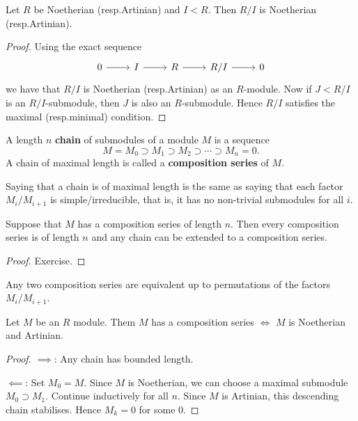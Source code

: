 \begin{prop}[3.7]
  Let $R$ be Noetherian (resp.\@ Artinian) and $I<R$.
  Then $R/I$ is Noetherian (resp.\@ Artinian).
\end{prop}

\begin{proof}
  Using the exact sequence
  \begin{equation*}
    \begin{tikzcd}
      0 \ar[r] & I \ar[r] & R \ar[r] & R/I \ar[r] & 0
    \end{tikzcd}
  \end{equation*}
  we have that $R/I$ is Noetherian (resp.\@ Artinian) as an $R$-module.
  Now if $J<R/I$ is an $R/I$-submodule, then $J$ is also an $R$-submodule.
  Hence $R/I$ satisfies the maximal (resp.\@ minimal) condition.
\end{proof}

\begin{defn}
  A length $n$ \textbf{chain} of submodules of a module $M$ is a sequence
  \[ M = M_0 \supset M_1 \supset M_2 \supset \cdots \supset M_n=0. \]
  A chain of maximal length is called a \textbf{composition series} of $M$.
\end{defn}

\begin{rmk}
  Saying that a chain is of maximal length is the same as saying that each factor $M_i/M_{i+1}$ is simple/irreducible, that is, it has no non-trivial submodules for all $i$.
\end{rmk}

\begin{prop}[3.9]
  Suppose that $M$ has a composition series of length $n$.  
  Then every composition series is of length $n$ and any chain can be extended to a composition series.
\end{prop}

\begin{proof}
  Exercise.
\end{proof}

\begin{rmk}
  Any two composition series are equivalent up to permutations of the factors $M_i/M_{i+1}$.
\end{rmk}

\begin{prop}[3.10]
  Let $M$ be an $R$ module.
  Them $M$ has a composition series $\iff$ $M$ is Noetherian and Artinian.
\end{prop}

\begin{proof}
  $\implies$:
  Any chain has bounded length.

  $\impliedby$:
  Set $M_0=M$.
  Since $M$ is Noetherian, we can choose a maximal submodule $M_0 \supset M_1$.
  Continue inductively for all $n$.
  Since $M$ is Artinian, this descending chain stabilises.
  Hence $M_k=0$ for some $0$.
\end{proof}


